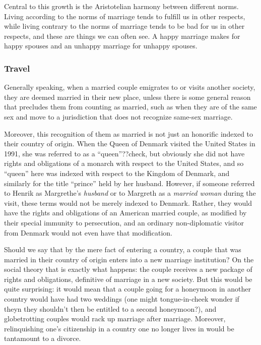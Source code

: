 Central to this growth is the Aristotelian harmony between different norms. Living according to the norms of marriage tends to fulfill us in other respects,
while living contrary to the norms of marriage tends to be bad for us in other respects, and these are things we can often see. A happy marriage makes for
happy spouses and an unhappy marriage for unhappy spouses.

\subsubsection{Travel}
Generally speaking, when a married couple emigrates to or visits another society, they are deemed married in their new place, unless there is some general reason that
precludes them from counting as married, such as when they are of the same sex and move to a jurisdiction that does not recognize same-sex marriage.

Moreover, this recognition of them as married is not just an honorific indexed to their country of origin. When the Queen of Denmark visited the United States in 1991,
she was referred to as a ``queen''??check, but obviously she did not have rights and obligations of a monarch with respect to the United States, and so ``queen''
here was indexed with respect to the Kingdom of Denmark, and similarly for the title ``prince'' held by her husband. However, if someone referred to Henrik
as Margrethe's \textit{husband} or to Margreth as a \textit{married woman} during the visit, these terms would not be merely indexed to Denmark. Rather, they would
have the rights and obligations of an American married couple, as modified by their special immunity to persecution, and an ordinary non-diplomatic visitor from
Denmark would not even have that modification.

Should we say that by the mere fact of entering a country, a couple that was married in their country of origin enters into a new marriage institution?
On the social theory that is exactly what happens: the couple receives a new package of rights and obligations, definitive of marriage in a new society.
But this would be quite surprising: it would mean that a couple going for a honeymoon in another country would have had two weddings (one might tongue-in-cheek wonder if
theyn they shouldn't then be entitled to a second honeymoon?), and globetrotting couples would rack up marriage after marriage. Moreover, relinquishing one's
citizenship in a country one no longer lives in would be tantamount to a divorce.

